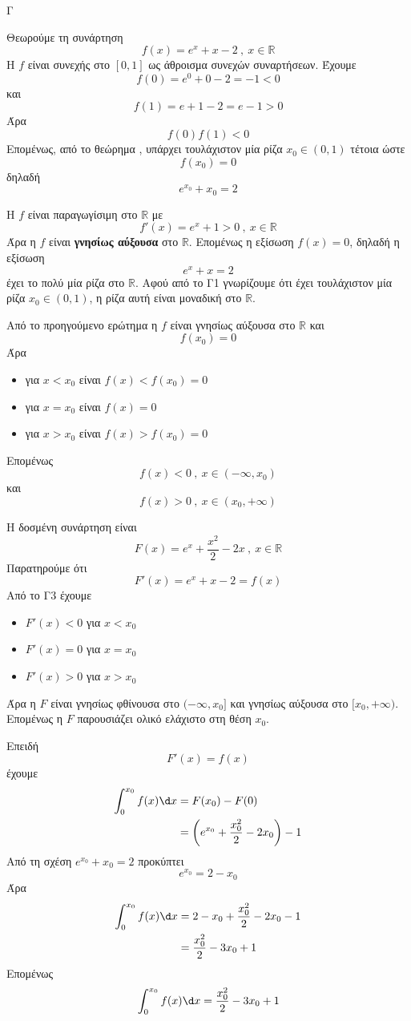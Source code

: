 \begin{thema}{Γ}
\begin{erwthma}
\item Θεωρούμε τη συνάρτηση
\[f(x)=e^x+x-2\ ,\ x\in\mathbb{R}\]
Η $f$ είναι συνεχής στο $[0,1]$ ως άθροισμα συνεχών συναρτήσεων.
Έχουμε
\[f(0)=e^0+0-2=-1<0\]
και
\[f(1)=e+1-2=e-1>0\]
Άρα
\[f(0)f(1)<0\]
Επομένως, από το θεώρημα , υπάρχει τουλάχιστον μία ρίζα $x_0\in(0,1)$ τέτοια ώστε
\[f(x_0)=0\]
δηλαδή
\[e^{x_0}+x_0=2\]

\item Η $f$ είναι παραγωγίσιμη στο $\mathbb{R}$ με
\[f'(x)=e^x+1>0\ ,\ x\in\mathbb{R}\]
Άρα η $f$ είναι \textbf{γνησίως αύξουσα} στο $\mathbb{R}$.
Επομένως η εξίσωση $f(x)=0$, δηλαδή η εξίσωση
\[e^x+x=2\]
έχει το πολύ μία ρίζα στο $\mathbb{R}$.
Αφού από το Γ1 γνωρίζουμε ότι έχει τουλάχιστον μία ρίζα $x_0\in(0,1)$, η ρίζα αυτή είναι μοναδική στο $\mathbb{R}$.

\item Από το προηγούμενο ερώτημα η $f$ είναι γνησίως αύξουσα στο $\mathbb{R}$ και
\[f(x_0)=0\]
Άρα
\begin{itemize}
\item για $x<x_0$ είναι $f(x)<f(x_0)=0$
\item για $x=x_0$ είναι $f(x)=0$
\item για $x>x_0$ είναι $f(x)>f(x_0)=0$
\end{itemize}
Επομένως
\[f(x)<0\ ,\ x\in(-\infty,x_0)\]
και
\[f(x)>0\ ,\ x\in(x_0,+\infty)\]

\item Η δοσμένη συνάρτηση είναι
\[F(x)=e^x+\frac{x^2}{2}-2x\ ,\ x\in\mathbb{R}\]
Παρατηρούμε ότι
\[F'(x)=e^x+x-2=f(x)\]
Από το Γ3 έχουμε
\begin{itemize}
\item $F'(x)<0$ για $x<x_0$
\item $F'(x)=0$ για $x=x_0$
\item $F'(x)>0$ για $x>x_0$
\end{itemize}
Άρα η $F$ είναι γνησίως φθίνουσα στο $(-\infty,x_0]$ και γνησίως αύξουσα στο $[x_0,+\infty)$.
Επομένως η $F$ παρουσιάζει ολικό ελάχιστο στη θέση $x_0$.

Επειδή
\[F'(x)=f(x)\]
έχουμε
\begin{align*}
\dint_0^{x_0} f(x)\d x&=F(x_0)-F(0)\\
&=\left(e^{x_0}+\frac{x_0^2}{2}-2x_0\right)-1
\end{align*}
Από τη σχέση $e^{x_0}+x_0=2$ προκύπτει
\[e^{x_0}=2-x_0\]
Άρα
\begin{align*}
\dint_0^{x_0} f(x)\d x
&=2-x_0+\frac{x_0^2}{2}-2x_0-1\\
&=\frac{x_0^2}{2}-3x_0+1
\end{align*}
Επομένως
\[\dint_0^{x_0} f(x)\d x=\frac{x_0^2}{2}-3x_0+1\]
\end{erwthma}
\end{thema}

